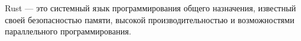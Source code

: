 Rust — это системный язык программирования общего назначения, известный своей безопасностью памяти, высокой производительностью и возможностями параллельного программирования\cite{HABR_WHY_RUST}.